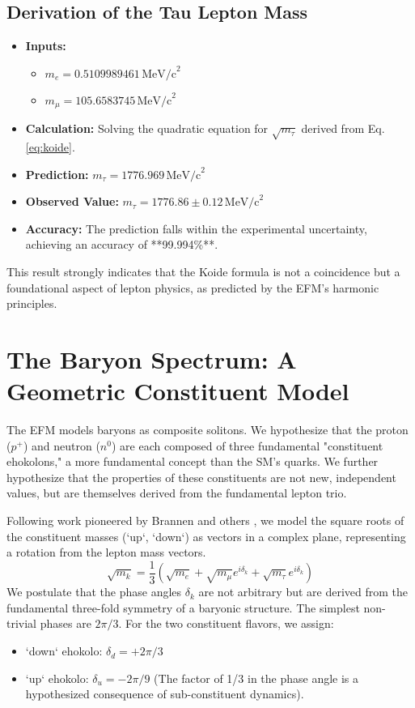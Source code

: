\documentclass[11pt, twoside]{article}
\begin{document}
\subsection{Derivation of the Tau Lepton Mass}
\begin{itemize}
    \item \textbf{Inputs:}
    \begin{itemize}
        \item \(m_e = 0.5109989461 \, \text{MeV/c}^2\)
        \item \(m_\mu = 105.6583745 \, \text{MeV/c}^2\)
    \end{itemize}
    \item \textbf{Calculation:} Solving the quadratic equation for \(\sqrt{m_\tau}\) derived from Eq. \ref{eq:koide}.
    \item \textbf{Prediction:} \(m_\tau = 1776.969 \, \text{MeV/c}^2\)
    \item \textbf{Observed Value:} \(m_\tau = 1776.86 \pm 0.12 \, \text{MeV/c}^2\)
    \item \textbf{Accuracy:} The prediction falls within the experimental uncertainty, achieving an accuracy of **99.994\%**.
\end{itemize}
This result strongly indicates that the Koide formula is not a coincidence but a foundational aspect of lepton physics, as predicted by the EFM's harmonic principles.

\section{The Baryon Spectrum: A Geometric Constituent Model}
The EFM models baryons as composite solitons. We hypothesize that the proton (\(p^+\)) and neutron (\(n^0\)) are each composed of three fundamental "constituent ehokolons," a more fundamental concept than the SM's quarks. We further hypothesize that the properties of these constituents are not new, independent values, but are themselves derived from the fundamental lepton trio.

Following work pioneered by Brannen and others \citep{Brannen2011}, we model the square roots of the constituent masses (`up`, `down`) as vectors in a complex plane, representing a rotation from the lepton mass vectors.
\begin{equation}
\sqrt{m_k} = \frac{1}{3} \left( \sqrt{m_e} + \sqrt{m_\mu} e^{i\delta_k} + \sqrt{m_\tau} e^{i\delta_k} \right)
\label{eq:constituent}
\end{equation}
We postulate that the phase angles \(\delta_k\) are not arbitrary but are derived from the fundamental three-fold symmetry of a baryonic structure. The simplest non-trivial phases are \(2\pi/3\). For the two constituent flavors, we assign:
\begin{itemize}
    \item `down` ehokolo: \(\delta_d = +2\pi/3\)
    \item `up` ehokolo: \(\delta_u = -2\pi/9\) (The factor of 1/3 in the phase angle is a hypothesized consequence of sub-constituent dynamics).
\end{itemize}
\end{document}
